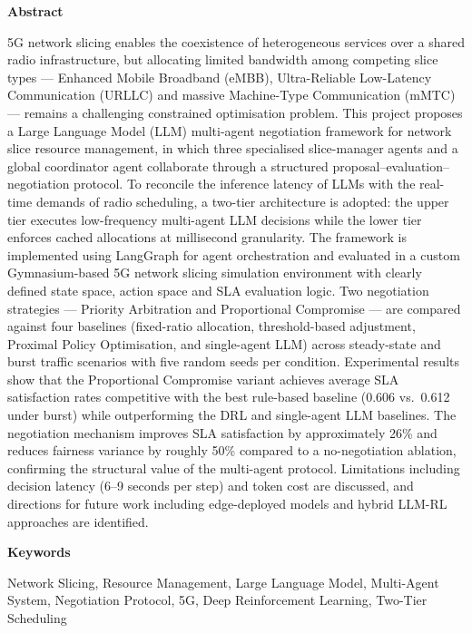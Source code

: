 \onehalfspacing
{} %
{\fontsize{16pt}{30pt}\selectfont \noindent\textbf{Abstract}}
\vspace{0.5cm}
{\fontsize{12pt}{18pt}\selectfont

5G network slicing enables the coexistence of heterogeneous services over a shared radio infrastructure, but allocating limited bandwidth among competing slice types --- Enhanced Mobile Broadband (eMBB), Ultra-Reliable Low-Latency Communication (URLLC) and massive Machine-Type Communication (mMTC) --- remains a challenging constrained optimisation problem. This project proposes a Large Language Model (LLM) multi-agent negotiation framework for network slice resource management, in which three specialised slice-manager agents and a global coordinator agent collaborate through a structured proposal--evaluation--negotiation protocol. To reconcile the inference latency of LLMs with the real-time demands of radio scheduling, a two-tier architecture is adopted: the upper tier executes low-frequency multi-agent LLM decisions while the lower tier enforces cached allocations at millisecond granularity. The framework is implemented using LangGraph for agent orchestration and evaluated in a custom Gymnasium-based 5G network slicing simulation environment with clearly defined state space, action space and SLA evaluation logic. Two negotiation strategies --- Priority Arbitration and Proportional Compromise --- are compared against four baselines (fixed-ratio allocation, threshold-based adjustment, Proximal Policy Optimisation, and single-agent LLM) across steady-state and burst traffic scenarios with five random seeds per condition. Experimental results show that the Proportional Compromise variant achieves average SLA satisfaction rates competitive with the best rule-based baseline (0.606 vs.\ 0.612 under burst) while outperforming the DRL and single-agent LLM baselines. The negotiation mechanism improves SLA satisfaction by approximately 26\% and reduces fairness variance by roughly 50\% compared to a no-negotiation ablation, confirming the structural value of the multi-agent protocol. Limitations including decision latency (6--9 seconds per step) and token cost are discussed, and directions for future work including edge-deployed models and hybrid LLM-RL approaches are identified.

}
\vspace{0.5cm}
{\fontsize{16pt}{30pt}\selectfont \noindent\textbf{Keywords}}
\vspace{0.5cm}
{\fontsize{12pt}{18pt}\selectfont

Network Slicing, Resource Management, Large Language Model, Multi-Agent System, Negotiation Protocol, 5G, Deep Reinforcement Learning, Two-Tier Scheduling

}

